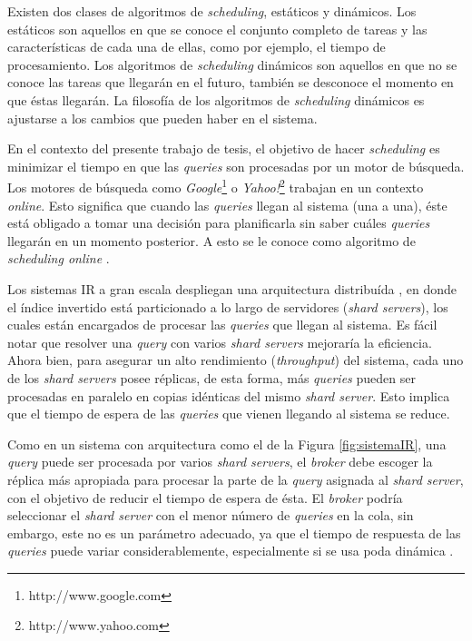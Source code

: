 Existen dos clases de algoritmos de \textit{scheduling}, estáticos y dinámicos. Los estáticos son aquellos en que se conoce el conjunto completo de tareas y las características de cada una de ellas, como por ejemplo, el tiempo de procesamiento. Los algoritmos de \textit{scheduling} dinámicos son aquellos en que no se conoce las tareas que llegarán en el futuro, también se desconoce el momento en que éstas llegarán. La filosofía de los algoritmos de \textit{scheduling} dinámicos es ajustarse a los cambios que pueden haber en el sistema.

En el contexto del presente trabajo de tesis, el objetivo de hacer \textit{scheduling} es minimizar el tiempo en que las \textit{queries} son procesadas por un motor de búsqueda. Los motores de búsqueda como \textit{Google}\footnote{http://www.google.com} o \textit{Yahoo!}\footnote{http://www.yahoo.com} trabajan en un contexto \textit{online}. Esto significa que cuando las \textit{queries} llegan al sistema (una a una), éste está obligado a tomar una decisión para planificarla sin saber cuáles \textit{queries} llegarán en un momento posterior. A esto se le conoce como algoritmo de \textit{scheduling online} \citep{Albers:2003, Borodin:1998}.

Los sistemas IR a gran escala despliegan una arquitectura distribuída \citep{Dean:2009}, en donde el índice invertido está particionado a lo largo de servidores (\textit{shard servers}), los cuales están encargados de procesar las \textit{queries} que llegan al sistema. Es fácil notar que resolver una \textit{query} con varios \textit{shard servers} mejoraría la eficiencia. Ahora bien, para asegurar un alto rendimiento (\textit{throughput}) del sistema, cada uno de los \textit{shard servers} posee réplicas, de esta forma, más \textit{queries} pueden ser procesadas en paralelo en copias idénticas del mismo \textit{shard server}. Esto implica que el tiempo de espera de las \textit{queries} que vienen llegando al sistema se reduce. 

Como en un sistema con arquitectura como el de la Figura \ref{fig:sistemaIR}, una \textit{query} puede ser procesada por varios \textit{shard servers}, el \textit{broker} debe escoger la réplica más apropiada para procesar la parte de la \textit{query} asignada al \textit{shard server}, con el objetivo de reducir el tiempo de espera de ésta. El \textit{broker} podría seleccionar el \textit{shard server} con el menor número de \textit{queries} en la cola, sin embargo, este no es un parámetro adecuado, ya que el tiempo de respuesta de las \textit{queries} puede variar considerablemente, especialmente si se usa poda dinámica \citep{Broder:2003, Moffat:1996}. 


